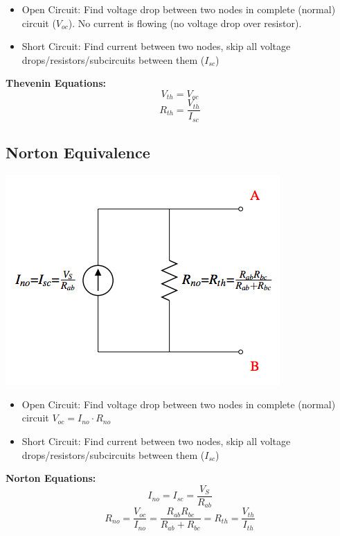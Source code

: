 \documentclass{article}\usepackage{amsmath,amssymb,amsthm,tikz,tkz-graph,color,chngpage,soul,hyperref,csquotes,graphicx,floatrow}\newcommand*{\QEDB}{\hfill\ensuremath{\square}}\newtheorem*{prop}{Proposition}\renewcommand{\theenumi}{\alph{enumi}}\usepackage[shortlabels]{enumitem}\usepackage[nobreak=true]{mdframed}\usetikzlibrary{matrix,calc}\MakeOuterQuote{"}\usepackage[margin=0.75in]{geometry} \newtheorem{theorem}{Theorem}
\begin{document}
\begin{itemize}
\item Open Circuit: Find voltage drop between two nodes in complete  (normal) circuit ($V_{oc}$). No current is flowing (no voltage drop over resistor).
\item Short Circuit: Find current between two nodes, skip all voltage drops/resistors/subcircuits between them ($I_{sc}$)
\end{itemize}
\begin{mdframed}
\textbf{Thevenin Equations:}\\
\begin{equation}V_{th} = V_{oc}\end{equation}
\begin{equation}R_{th} = \frac{V_{th}}{I_{sc}}\end{equation}
\end{mdframed}

\subsection*{Norton Equivalence}
\begin{center}\includegraphics{norton}\end{center}
\begin{itemize}
\item Open Circuit:  Find voltage drop between two nodes in complete (normal) circuit $V_{oc} = I_{no}\cdot R_{no}$
\item Short Circuit: Find current between two nodes, skip all voltage drops/resistors/subcircuits between them ($I_{sc}$)
\end{itemize}
\begin{mdframed}
\textbf{Norton Equations:}\\
\begin{equation}I_{no}=I_{sc}=\frac{V_{S}}{R_{ab}}\end{equation}
\begin{equation}R_{no}=\frac{V_{oc}}{I_{no}} = \frac{R_{ab}R_{bc}}{R_{ab}+R_{bc}}=R_{th}=\frac{V_{th}}{I_{th}}\end{equation}
\end{mdframed}
\end{document}

